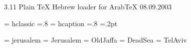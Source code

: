 


\makeatletter 
{} {3.11 Plain TeX Hebrew loader for ArabTeX} {08.09.2003}


\iffalse
\fi


\font \hclassic = hclassic \relax	%
		\hclassic =.8\hclassic
		\hclassic
\font \hcaption = hcaption \relax	%
		\hcaption =.8\hcaption
		\hcaption
		\hcaption =.2pt \relax
						
\def \hc {\sethebfont {\hclassic}}
\def \hp {\sethebfont {\hcaption}}

\all@wcmd \hc	\all@wcmd \hp		%

\font \jerusalem = jerusalem \relax	
\font \Jerusalem = Jerusalem \relax	
\font \OldJaffa = OldJaffa \relax	
\font \DeadSea = DeadSea \relax	
\font \TelAviv = TelAviv \relax	

